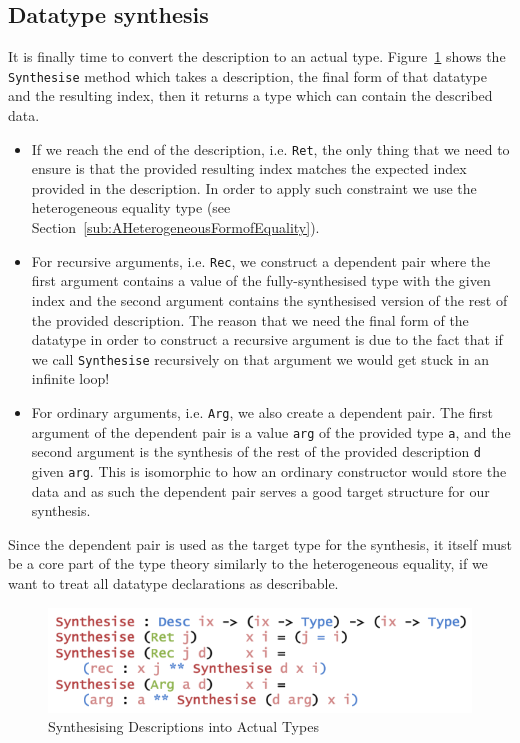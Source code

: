 \documentclass{ituthesis}
\newcommand{\ttconstructor}[1]{\textcolor{constructor-color}{\texttt{#1}}}
\newcommand{\ttdec}[1]{\textcolor{declared-var-color}{\texttt{#1}}}
\newcommand{\ttvar}[1]{\textcolor{local-var-color}{\texttt{#1}}}
\theoremstyle{definition}
\begin{document}
\subsection{Datatype synthesis}
\label{sub:DatatypeSynthesis}
It is finally time to convert the description to an actual type. Figure~\ref{fig:synthdata} shows the \ttdec{Synthesise} method which takes a description, the final form of that datatype and the resulting index, then it returns a type which can contain the described data.

\begin{itemize}
  \item If we reach the end of the description, i.e. \ttconstructor{Ret}, the only thing that we need to ensure is that the provided resulting index matches the expected index provided in the description. In order to apply such constraint we use the heterogeneous equality type (see Section~\ref{sub:AHeterogeneousFormofEquality}).
  \item For recursive arguments, i.e. \ttconstructor{Rec}, we construct a dependent pair where the first argument contains a value of the fully-synthesised type with the given index and the second argument contains the synthesised version of the rest of the provided description. The reason that we need the final form of the datatype in order to construct a recursive argument is due to the fact that if we call \ttdec{Synthesise} recursively on that argument we would get stuck in an infinite loop!
  \item For ordinary arguments, i.e. \ttconstructor{Arg}, we also create a dependent pair. The first argument of the dependent pair is a value \ttvar{arg} of the provided type \ttvar{a}, and the second argument is the synthesis of the rest of the provided description \ttvar{d} given \ttvar{arg}. This is isomorphic to how an ordinary constructor would store the data and as such the dependent pair serves a good target structure for our synthesis.
\end{itemize}
Since the dependent pair is used as the target type for the synthesis, it itself must be a core part of the type theory similarly to the heterogeneous equality, if we want to treat all datatype declarations as describable.

\begin{figure}[ht]
\begin{center}
    \includegraphics[scale=0.5]{Figures/SynthesisingData.png}
\end{center}
\caption{Synthesising Descriptions into Actual Types}
\label{fig:synthdata}
\end{figure}
\end{document}
